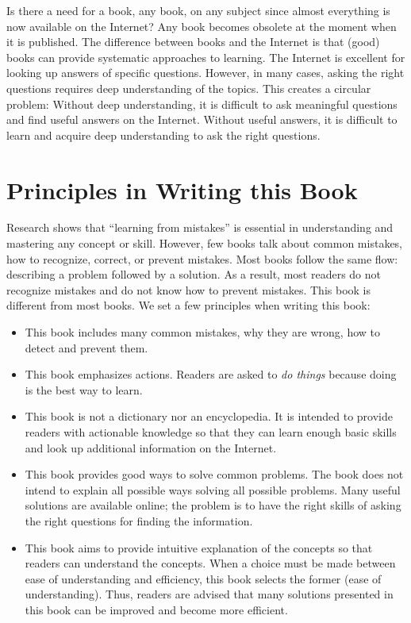 Is there a need for a book, any book, on any subject since almost
everything is now available on the Internet?  Any book becomes
obsolete at the moment when it is published.  The difference between
books and the Internet is that (good) books can provide systematic
approaches to learning. The Internet is excellent for looking up
answers of specific questions. However, in many cases, asking the
right questions requires deep understanding of the topics.  This
creates a circular problem: Without deep understanding, it is
difficult to ask meaningful questions and find useful answers on the
Internet. Without useful answers, it is difficult to learn and acquire
deep understanding to ask the right questions.

\section*{Principles in Writing this Book}

Research shows that ``learning from mistakes'' is essential in
understanding and mastering any concept or skill.  However, few books
talk about common mistakes, how to recognize, correct, or prevent
mistakes.  Most books follow the same flow: describing a problem
followed by a solution.  As a result, most readers do not recognize
mistakes and do not know how to prevent mistakes.  This book is
different from most books.  We set a few principles when writing this
book:

\begin{itemize}
\item This book includes many common mistakes, why they are wrong, how
  to detect and prevent them.
  
\item This book emphasizes actions. Readers are asked to {\it do
  things} because doing is the best way to learn.

\item This book is not a dictionary nor an encyclopedia.  It is
  intended to provide readers with actionable knowledge so that they
  can learn enough basic skills and look up additional information on
  the Internet.  

\item This book provides good ways to solve common problems.
  The book does not intend to explain all possible ways
  solving all possible problems. Many useful solutions
  are available online; the problem is to have 
  the right skills of asking the right questions for
  finding the information.

\item This book aims to provide intuitive explanation of the concepts
  so that readers can understand the concepts.  When a choice must be
  made between ease of understanding and efficiency, this book selects
  the former (ease of understanding).  Thus, readers are advised that
  many solutions presented in this book can be improved and become
  more efficient.
  
\end{itemize}

